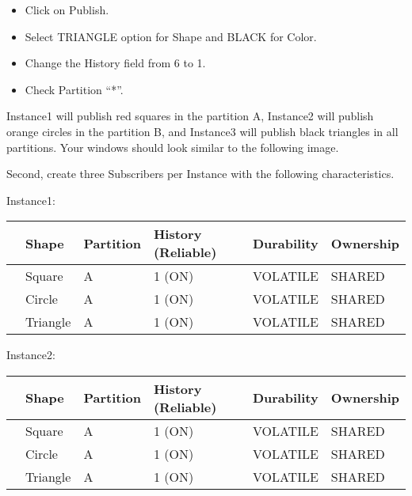 \documentclass[letterpaper,10pt,english]{sphinxmanual}
\begin{document}
\begin{description}
\begin{itemize}
\item {} 
Click on Publish.

\item {} 
Select TRIANGLE option for Shape and BLACK for Color.

\item {} 
Change the History field from 6 to 1.

\item {} 
Check Partition “*”.

\end{itemize}

\end{description}

Instance1 will publish red squares in the partition A, Instance2 will publish orange circles in the partition B, and Instance3 will publish black triangles in all partitions. Your windows should look similar to the following image.


Second, create three Subscribers per Instance with the following characteristics.

Instance1:


\begin{savenotes}\sphinxattablestart
\centering
\begin{tabulary}{\linewidth}[t]{|T|T|T|T|T|T|}
\hline
\sphinxstyletheadfamily &\sphinxstyletheadfamily 
Shape
&\sphinxstyletheadfamily 
Partition
&\sphinxstyletheadfamily 
History (Reliable)
&\sphinxstyletheadfamily 
Durability
&\sphinxstyletheadfamily 
Ownership
\\
\hline&
Square
&
A
&
1 (ON)
&
VOLATILE
&
SHARED
\\
\hline
{}
&
Circle
&
A
&
1 (ON)
&
VOLATILE
&
SHARED
\\
\hline&
Triangle
&
A
&
1 (ON)
&
VOLATILE
&
SHARED
\\
\hline
\end{tabulary}
\par
\sphinxattableend\end{savenotes}

Instance2:


\begin{savenotes}\sphinxattablestart
\centering
\begin{tabulary}{\linewidth}[t]{|T|T|T|T|T|T|}
\hline
\sphinxstyletheadfamily &\sphinxstyletheadfamily 
Shape
&\sphinxstyletheadfamily 
Partition
&\sphinxstyletheadfamily 
History (Reliable)
&\sphinxstyletheadfamily 
Durability
&\sphinxstyletheadfamily 
Ownership
\\
\hline&
Square
&
A
&
1 (ON)
&
VOLATILE
&
SHARED
\\
\hline
{}
&
Circle
&
A
&
1 (ON)
&
VOLATILE
&
SHARED
\\
\hline&
Triangle
&
A
&
1 (ON)
&
VOLATILE
&
SHARED
\\
\hline
\end{tabulary}
\par
\sphinxattableend\end{savenotes}
\end{document}

